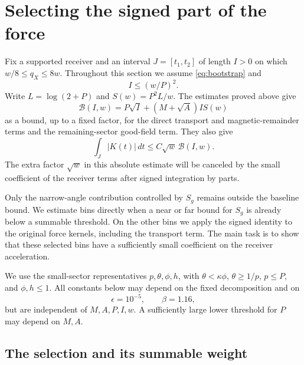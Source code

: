 \section{Selecting the signed part of the force}\label{sel:section}

Fix a supported receiver and an interval $J=[t_1,t_2]$ of length $I>0$
on which $w/8\le q_X\le8w$. Throughout this section we assume
\eqref{eq:bootstrap} and
\begin{equation}\label{sel:short}
 I\le (w/P)^2.
\end{equation}
Write $L=\log(2+P)$ and $S(w)=P^2L/w$. The estimates proved above give
\begin{equation}\label{sel:baseline}
 \mathcal B(I,w)=P\sqrt I+(M+\sqrt A)I S(w)
\end{equation}
as a bound, up to a fixed factor, for the direct transport and magnetic-remainder
terms and the remaining-sector good-field term. They also give
\begin{equation}\label{sel:absolute}
 \int_J|K(t)|\,dt\le C\sqrt w\,\mathcal B(I,w).
\end{equation}
The extra factor $\sqrt w$ in this absolute estimate will be canceled by
the small coefficient of the receiver terms after signed integration by
parts.

Only the narrow-angle contribution controlled by $S_g$ remains outside
the baseline bound. We estimate bins directly when a near or far bound
for $S_g$ is already below a summable threshold. On the other bins we
apply the signed identity to the original force kernels, including the
transport term. The main task is to show that these selected bins have
a sufficiently small coefficient on the receiver acceleration.

We use the small-sector representatives $p,\theta,\phi,h$, with
$\theta<\kappa\phi$, $\theta\ge1/p$, $p\le P$, and $\phi,h\le1$.
All constants below may depend on the fixed decomposition and on
\begin{equation}\label{sel:epsilon}
 \epsilon=10^{-5},\qquad \beta=1.16,
\end{equation}
but are independent of $M,A,P,I,w$. A sufficiently large lower threshold
for $P$ may depend on $M,A$.

\subsection{The selection and its summable weight}

